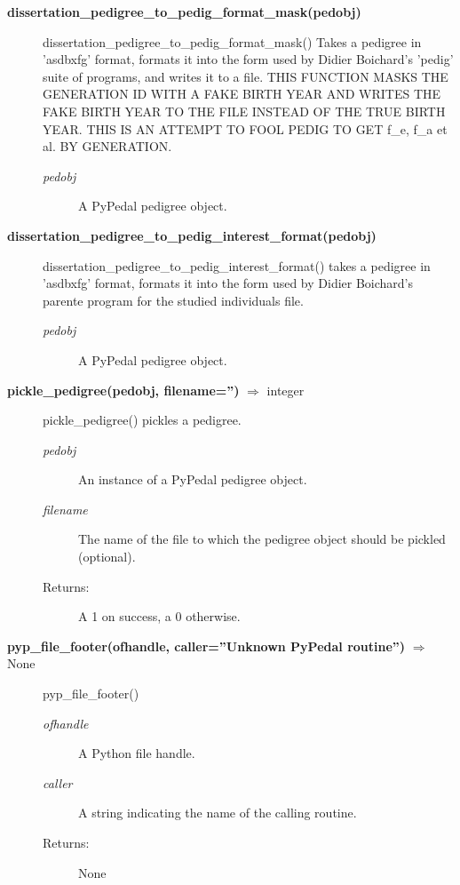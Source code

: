 \begin{description}
\item[\textbf{dissertation\_pedigree\_to\_pedig\_format\_mask(pedobj)}]
dissertation\_pedigree\_to\_pedig\_format\_mask() Takes a pedigree in 'asdbxfg' format, formats it into the form used by Didier Boichard's 'pedig' suite of programs, and writes it to a file. THIS FUNCTION MASKS THE GENERATION ID WITH A FAKE BIRTH YEAR AND WRITES THE FAKE BIRTH YEAR TO THE FILE INSTEAD OF THE TRUE BIRTH YEAR. THIS IS AN ATTEMPT TO FOOL PEDIG TO GET f\_e, f\_a et al. BY GENERATION.
\begin{description}
\item[\emph{pedobj}] A PyPedal pedigree object.
\end{description}

\item[\textbf{dissertation\_pedigree\_to\_pedig\_interest\_format(pedobj)}]
dissertation\_pedigree\_to\_pedig\_interest\_format() takes a pedigree in 'asdbxfg' format, formats it into the form used by Didier Boichard's parente program for the studied individuals file.
\begin{description}
\item[\emph{pedobj}] A PyPedal pedigree object.
\end{description}

\item[\textbf{pickle\_pedigree(pedobj, filename='')} $\Rightarrow$ integer]
pickle\_pedigree() pickles a pedigree.
\begin{description}
\item[\emph{pedobj}] An instance of a PyPedal pedigree object.
\item[\emph{filename}] The name of the file to which the pedigree object should be pickled (optional).
\item[Returns:] A 1 on success, a 0 otherwise.
\end{description}

\item[\textbf{pyp\_file\_footer(ofhandle, caller=''Unknown PyPedal routine'')} $\Rightarrow$ None]
pyp\_file\_footer()
\begin{description}
\item[\emph{ofhandle}] A Python file handle.
\item[\emph{caller}] A string indicating the name of the calling routine.
\item[Returns:] None
\end{description}


\end{description}
